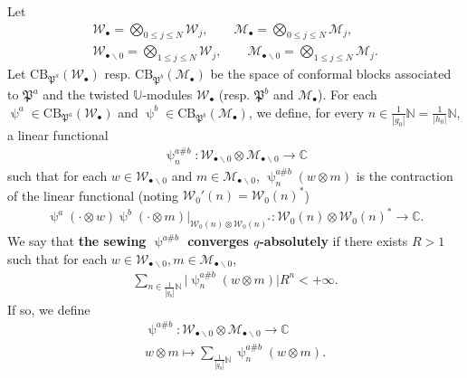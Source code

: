 \documentclass[12pt,a4paper,notitlepage]{article}
\theoremstyle{definition}
\theoremstyle{plain}
\newcommand{\fk}{\mathfrak}
\newcommand{\mc}{\mathcal}
\newcommand{\blt}{\bullet}
\newcommand{\Ubb}{\mathbb U}
\newcommand{\Cbb}{\mathbb C}
\newcommand{\Nbb}{\mathbb N}
\newcommand{\CB}{\mathrm{CB}}
\numberwithin{equation}{subsection}
\begin{document}
Let 
\begin{gather*}
\mc W_\blt=\bigotimes_{0\leq j\leq N}\mc W_j,\qquad 	\mc M_\blt=\bigotimes_{0\leq j\leq N}\mc M_j,\\
\mc W_{\blt\backslash 0}=\bigotimes_{1\leq j\leq N}\mc W_j,\qquad 	\mc M_{\blt\backslash 0}=\bigotimes_{1\leq j\leq N}\mc M_j.
\end{gather*}
Let $\CB_{\fk P^a}(\mc W_\blt)$ resp. $\CB_{\fk P^b}(\mc M_\blt)$ be the space of conformal blocks associated to $\fk P^a$ and the twisted $\Ubb$-modules $\mc W_\blt$ (resp. $\fk P^b$ and $\mc M_\blt$).  For each $\uppsi^a\in\CB_{\fk P^a}(\mc W_\blt)$ and $\uppsi^b\in\CB_{\fk P^b}(\mc M_\blt)$, we define, for every $n\in \frac 1{|g_0|}\Nbb=\frac{1}{|h_0|}\Nbb$, a linear functional
\begin{align*}
\uppsi^{a\#b}_n:	\mc W_{\blt\backslash 0}\otimes\mc M_{\blt\backslash 0}\rightarrow \Cbb
\end{align*}
such that for each $w\in \mc W_{\blt\backslash 0}$ and $m\in \mc M_{\blt\backslash 0}$, $\uppsi^{a\#b}_n(w\otimes m)$ is the contraction of the linear functional (noting $\mc W_0'(n)=\mc W_0(n)^*$)
\begin{align*}
\uppsi^a(\cdot \otimes w)\uppsi^b(\cdot\otimes m)\Big|_{\mc W_0(n)\otimes\mc W_0(n)^*}:	\mc W_0(n)\otimes\mc W_0(n)^*\rightarrow\Cbb.
\end{align*}
We say that  \textbf{the sewing $\uppsi^{a\#b}$ converges $q$-absolutely} if there exists $R>1$ such that for each $w\in\mc W_{\blt\backslash 0},m\in\mc M_{\blt\backslash 0}$, 
\begin{align*}
\sum_{n\in\frac 1{|g_0|}\Nbb}\big|\uppsi_n^{a\#b}(w\otimes m)\big|R^n<+\infty.
\end{align*} 
If so, we define
\begin{gather*}
\uppsi^{a\#b}:	\mc W_{\blt\backslash 0}\otimes\mc M_{\blt\backslash 0}\rightarrow \Cbb\\
w\otimes m\mapsto \sum_{\frac 1{|g_0|}\Nbb}\uppsi^{a\#b}_n(w\otimes m).
\end{gather*}
\end{document}
